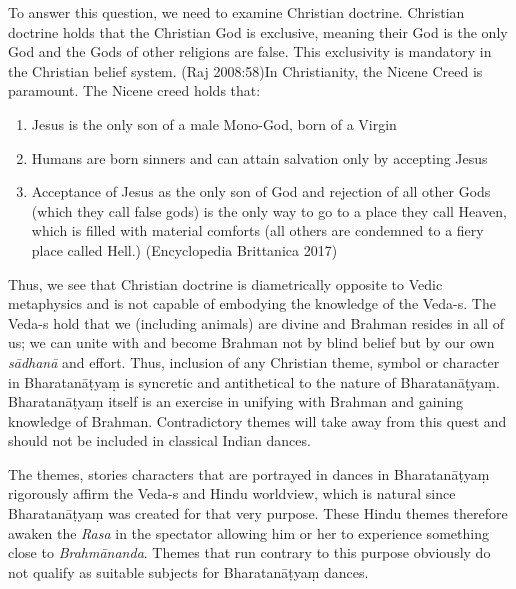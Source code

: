 \vskip 2pt

To answer this question, we need to examine Christian doctrine. Christian doctrine holds that the Christian God is exclusive, meaning their God is the only God and the Gods of other religions are false. This exclusivity is mandatory in the Christian belief system. (Raj 2008:58)In Christianity, the Nicene Creed is paramount. The Nicene creed holds that:

\begin{enumerate}[{\rm 1)}]
\itemsep=0pt
\item Jesus is the only son of a male Mono-God, born of a Virgin 

 \item Humans are born sinners and can attain salvation only by accepting Jesus

 \item Acceptance of Jesus as the only son of God and rejection of all other Gods (which they call false gods) is the only way to go to a place they call Heaven, which is filled with material comforts (all others are condemned to a fiery place called Hell.) (Encyclopedia Brittanica 2017)

\end{enumerate}

Thus, we see that Christian doctrine is diametrically opposite to Vedic metaphysics and is not capable of embodying the knowledge of the Veda-s. The Veda-s hold that we (including animals) are divine and Brahman resides in all of us; we can unite with and become Brahman not by blind belief but by our own \textit{sādhanā} and effort. Thus, inclusion of any Christian theme, symbol or character in Bharatanāṭyaṃ is syncretic and antithetical to the nature of Bharatanāṭyaṃ. Bharatanāṭyaṃ itself is an exercise in unifying with Brahman and gaining knowledge of Brahman. Contradictory themes will take away from this quest and should not be included in classical Indian dances.

The themes, stories characters that are portrayed in dances in Bharatanāṭyaṃ rigorously affirm the Veda-s and Hindu worldview, which is natural since Bharatanāṭyaṃ was created for that very purpose. These Hindu themes therefore awaken the \textit{Rasa} in the spectator allowing him or her to experience something close to \textit{Brahmānanda}. Themes that run contrary to this purpose obviously do not qualify as suitable subjects for Bharatanāṭyaṃ dances.

